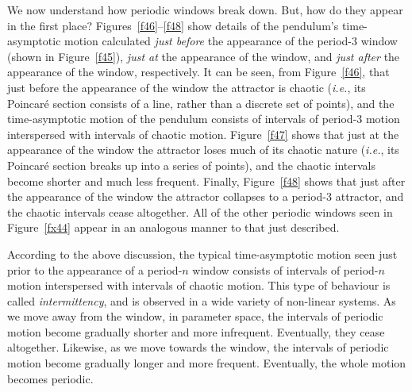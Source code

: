 We now understand how periodic windows break down. But, how do they appear in the
first place? Figures~\ref{f46}--\ref{f48} show details of the pendulum's time-asymptotic
motion calculated {\em just before}\/ the appearance of the period-3 window (shown in Figure~\ref{f45}), {\em just at}\/ the appearance of the window, and {\em just after}\/ the appearance of the window,
respectively. It can be seen, from Figure~\ref{f46}, that just before the appearance of the
window the attractor is chaotic ({\em i.e.}, its Poincar\'e section consists of a line,
rather than a discrete set of points), and the time-asymptotic motion of the pendulum
consists of intervals of period-3 motion interspersed with intervals of chaotic motion.
Figure~\ref{f47} shows that just at the appearance of the window the attractor
loses much of its chaotic nature ({\em i.e.}, its Poincar\'e section  breaks up into a series 
of points), and the chaotic intervals  become shorter and much less frequent. Finally,
Figure~\ref{f48} shows that just after the appearance of the window the attractor
collapses to a period-3 attractor, and the chaotic intervals cease altogether. 
All of the other periodic windows seen in Figure~\ref{fx44} appear in an analogous manner to that
just described.

According to the above discussion,
the typical time-asymptotic motion seen just prior to the appearance of a period-$n$ window
consists of intervals of period-$n$ motion interspersed with intervals of chaotic
motion. This type of behaviour is called {\em intermittency}, and is observed in a
wide variety of non-linear systems. As we move away from the window, in parameter
space, the intervals of periodic motion become gradually shorter and more infrequent. 
Eventually, they cease altogether. Likewise, as we move towards the window, the
intervals of periodic motion become gradually longer and more frequent. Eventually,
the whole motion becomes periodic. 

